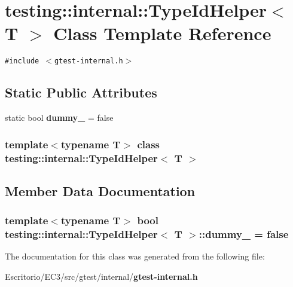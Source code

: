 \section{testing::internal::TypeIdHelper$<$ T $>$ Class Template Reference}
\label{classtesting_1_1internal_1_1TypeIdHelper}
{\tt \#include $<$gtest-internal.h$>$}

\subsection*{Static Public Attributes}
\begin{CompactItemize}
\item 
static bool {\bf dummy\_\-} = false
\end{CompactItemize}
\subsubsection*{template$<$typename T$>$ class testing::internal::TypeIdHelper$<$ T $>$}



\subsection{Member Data Documentation}
\subsubsection{\setlength{\rightskip}{0pt plus 5cm}template$<$typename T$>$ bool {\bf testing::internal::TypeIdHelper}$<$ T $>$::{\bf dummy\_\-} = false\hspace{0.3cm}{\tt  [inline, static]}}\label{classtesting_1_1internal_1_1TypeIdHelper_fda8535da3b83a244c0728dee7d5e805}




The documentation for this class was generated from the following file:\begin{CompactItemize}
\item 
Escritorio/EC3/src/gtest/internal/{\bf gtest-internal.h}\end{CompactItemize}
